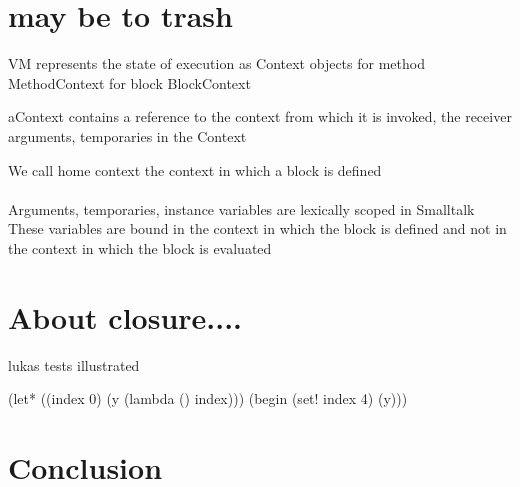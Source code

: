\documentclass[a4paper,10pt,twoside]{book}
\begin{document}
\section{may be to trash}
VM represents the state of execution as Context objects
for method MethodContext
for block BlockContext

aContext contains a reference to the context from which it is invoked, the receiver arguments, temporaries in the Context

We call home context the context in which a block is defined


\paragraph{}
Arguments, temporaries, instance variables are lexically scoped in Smalltalk
These variables are bound in the context in which the block is defined and not in the context in which the block is evaluated


\section{About closure....}
lukas tests illustrated 

\begin{code}{}
(let* ((index 0)
       (y (lambda () index)))
  (begin
    (set! index 4)
    (y)))
\end{code}


\section{Conclusion}


\ifx\wholebook\relax\else
   
   
\end{document}
